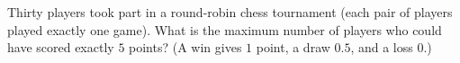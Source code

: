 Thirty players took part in a round-robin chess tournament (each pair of players played exactly one game). What is the maximum number of players who could have scored exactly $5$ points? (A win gives $1$ point, a draw $0.5$, and a loss $0$.)
